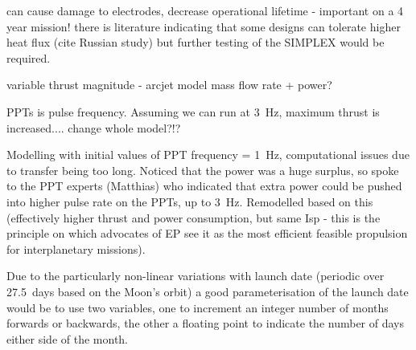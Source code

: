 can cause damage to electrodes, decrease operational lifetime - important on a 4 year mission! there is literature indicating that some designs can tolerate higher heat flux (cite Russian study) but further testing of the SIMPLEX would be required.


variable thrust magnitude - arcjet model mass flow rate + power?

PPTs is pulse frequency. Assuming we can run at 3~Hz, maximum thrust is increased.... change whole model?!?

Modelling with initial values of PPT frequency = 1~Hz, computational issues due to transfer being too long. Noticed that the power was a huge surplus, so spoke to the PPT experts (Matthias) who indicated that extra power could be pushed into higher pulse rate on the PPTs, up to 3~Hz. Remodelled based on this (effectively higher thrust and power consumption, but same Isp - this is the principle on which advocates of EP see it as the most efficient feasible propulsion for interplanetary missions).

Due to the particularly non-linear variations with launch date (periodic over 27.5~days based on the Moon's orbit) a good parameterisation of the launch date would be to use two variables, one to increment an integer number of months forwards or backwards, the other a floating point to indicate the number of days either side of the month.

